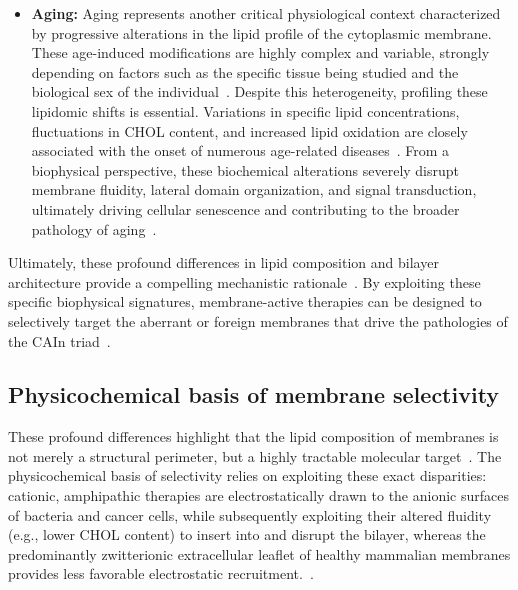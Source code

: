 \begin{itemize}
    \item \textbf{Aging:} Aging represents another critical physiological context characterized by progressive alterations in the lipid profile of the cytoplasmic membrane. These age-induced modifications are highly complex and variable, strongly depending on factors such as the specific tissue being studied and the biological sex of the individual~\cite{ref42}. Despite this heterogeneity, profiling these lipidomic shifts is essential. Variations in specific lipid concentrations, fluctuations in CHOL content, and increased lipid oxidation are closely associated with the onset of numerous age-related diseases~\cite{ref43,ref44}. From a biophysical perspective, these biochemical alterations severely disrupt membrane fluidity, lateral domain organization, and signal transduction, ultimately driving cellular senescence and contributing to the broader pathology of aging~\cite{Montoliu2014}.
\end{itemize}

Ultimately, these profound differences in lipid composition and bilayer architecture provide a compelling mechanistic rationale~\cite{van2008membrane}. By exploiting these specific biophysical signatures, membrane-active therapies can be designed to selectively target the aberrant or foreign membranes that drive the pathologies of the CAIn triad~\cite{Casares2019,Fu2021}.

\subsection{Physicochemical basis of membrane selectivity}

These profound differences highlight that the lipid composition of membranes is not merely a structural perimeter, but a highly tractable molecular target~\cite{DANI_LIPIDOS,lipidomics_1}. The physicochemical basis of selectivity relies on exploiting these exact disparities: cationic, amphipathic therapies are electrostatically drawn to the anionic surfaces of bacteria and cancer cells, while subsequently exploiting their altered fluidity (e.g., lower CHOL content) to insert into and disrupt the bilayer, whereas the predominantly zwitterionic extracellular leaflet of healthy mammalian membranes provides less favorable electrostatic recruitment.~\cite{torres2019peptide}. 

